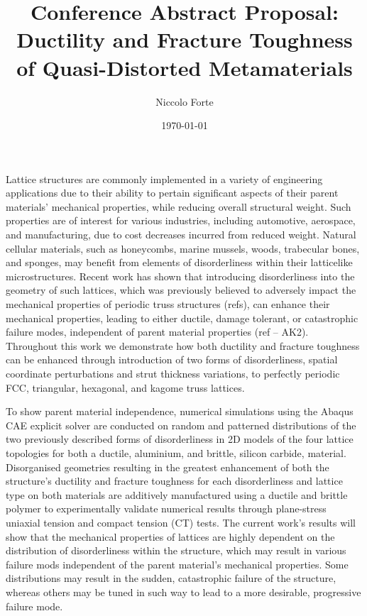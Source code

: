 \documentclass{article}
\title{Conference Abstract Proposal:\\Ductility and Fracture Toughness of Quasi-Distorted Metamaterials}
\author{Niccolo Forte}
\date{\today}
\begin{document}
\maketitle

\section*{}
Lattice structures are commonly implemented in a variety of engineering applications due to their ability to pertain significant aspects of their parent materials’ mechanical properties, while reducing overall structural weight. Such properties are of interest for various industries, including automotive, aerospace, and manufacturing, due to cost decreases incurred from reduced weight. Natural cellular materials, such as honeycombs, marine mussels, woods, trabecular bones, and sponges, may benefit from elements of disorderliness within their latticelike microstructures. Recent work has shown that introducing disorderliness into the geometry of such lattices, which was previously believed to adversely impact the mechanical properties of periodic truss structures (refs), can enhance their mechanical properties, leading to either ductile, damage tolerant, or catastrophic failure modes, independent of parent material properties (ref – AK2). Throughout this work we demonstrate how both ductility and fracture toughness can be enhanced through introduction of two forms of disorderliness, spatial coordinate perturbations and strut thickness variations, to perfectly periodic FCC, triangular, hexagonal, and kagome truss lattices.

To show parent material independence, numerical simulations using the Abaqus CAE explicit solver are conducted on random and patterned distributions of the two previously described forms of disorderliness in 2D models of the four lattice topologies for both a ductile, aluminium, and brittle, silicon carbide, material. Disorganised geometries resulting in the greatest enhancement of both the structure’s ductility and fracture toughness for each disorderliness and lattice type on both materials are additively manufactured using a ductile and brittle polymer to experimentally validate numerical results through plane-stress uniaxial tension and compact tension (CT) tests. The current work’s results will show that the mechanical properties of lattices are highly dependent on the distribution of disorderliness within the structure, which may result in various failure mods independent of the parent material’s mechanical properties. Some distributions may result in the sudden, catastrophic failure of the structure, whereas others may be tuned in such way to lead to a more desirable, progressive failure mode.
\end{document}
